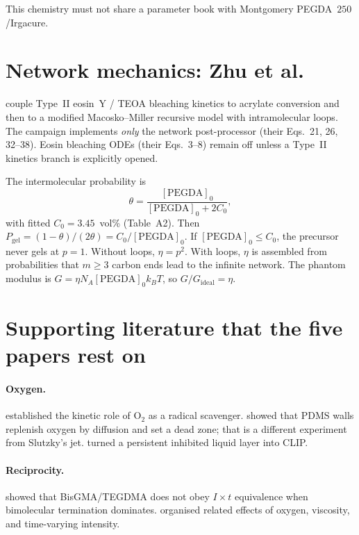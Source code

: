 This chemistry must not share a parameter book with Montgomery PEGDA~$250$/Irgacure.

\section{Network mechanics: Zhu et al.}

\citet{Zhu2020} couple Type~II eosin~Y / TEOA bleaching kinetics to acrylate conversion and then to a modified Macosko--Miller recursive model with intramolecular loops.
The campaign implements \emph{only} the network post-processor (their Eqs.~21, 26, 32--38).
Eosin bleaching ODEs (their Eqs.~3--8) remain off unless a Type~II kinetics branch is explicitly opened.

The intermolecular probability is
\begin{equation}
  \theta=\frac{[\mathrm{PEGDA}]_0}{[\mathrm{PEGDA}]_0+2C_0},
\end{equation}
with fitted $C_0=3.45$~vol\% (Table~A2).
Then $P_{\mathrm{gel}}=(1-\theta)/(2\theta)=C_0/[\mathrm{PEGDA}]_0$.
If $[\mathrm{PEGDA}]_0\le C_0$, the precursor never gels at $p=1$.
Without loops, $\eta=p^2$.
With loops, $\eta$ is assembled from probabilities that $m\ge 3$ carbon ends lead to the infinite network.
The phantom modulus is $G=\eta N_A[\mathrm{PEGDA}]_0 k_B T$, so $G/G_{\mathrm{ideal}}=\eta$.

\section{Supporting literature that the five papers rest on}

\paragraph{Oxygen.}
\citet{Decker1985} established the kinetic role of $\mathrm{O}_2$ as a radical scavenger.
\citet{Dendukuri2008} showed that PDMS walls replenish oxygen by diffusion and set a dead zone; that is a different experiment from Slutzky's jet.
\citet{Tumbleston2015} turned a persistent inhibited liquid layer into CLIP.

\paragraph{Reciprocity.}
\citet{Wydra2014} showed that BisGMA/TEGDMA does not obey $I\times t$ equivalence when bimolecular termination dominates.
\citet{Lin2019} organised related effects of oxygen, viscosity, and time-varying intensity.

